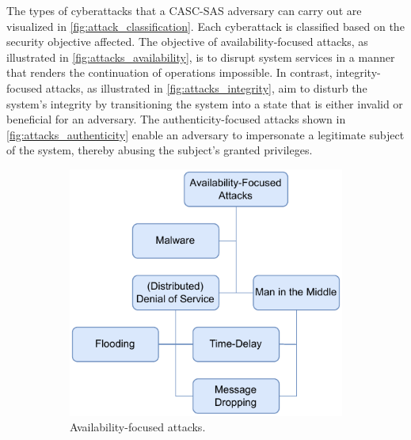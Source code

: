 The types of cyberattacks that a CASC-SAS adversary can carry out are visualized in \autoref{fig:attack_classification}.
Each cyberattack is classified based on the security objective affected.
The objective of availability-focused attacks, as illustrated in \autoref{fig:attacks_availability}, is to disrupt system services in a manner that renders the continuation of operations impossible.
In contrast, integrity-focused attacks, as illustrated in \autoref{fig:attacks_integrity}, aim to disturb the system's integrity by transitioning the system into a state that is either invalid or beneficial for an adversary.
The authenticity-focused attacks shown in \autoref{fig:attacks_authenticity} enable an adversary to impersonate a legitimate subject of the system, thereby abusing the subject's granted privileges.
\begin{figure}
    \centering
    \begin{subfigure}[t]{0.38\linewidth}
        \centering
        \includegraphics[width=\linewidth]{figures/attacks_availability.drawio.pdf}
        \caption{Availability-focused attacks.}
        \label{fig:attacks_availability}
    \end{subfigure}
    \hfill
    \begin{subfigure}[t]{0.295\linewidth}
        \centering

\end{subfigure}
\end{figure}
